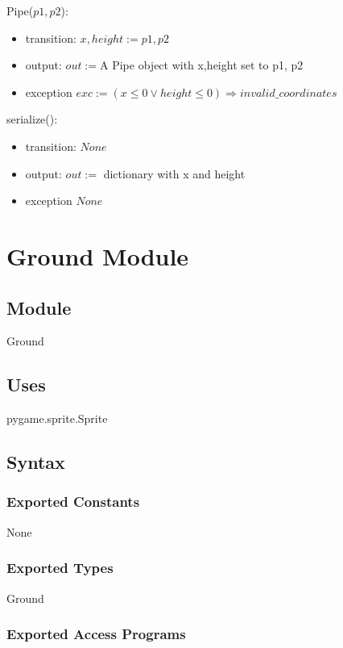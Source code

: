 \documentclass[12pt]{article}
\begin{document}
\noindent Pipe($p1, p2$):
\begin{itemize}
\item transition: $x, height := p1, p2$
\item output: $out := $A Pipe object with x,height set to p1, p2
\item exception $ exc := (x \leq 0 \lor height \leq 0 ) \Rightarrow invalid\_coordinates $
\end{itemize}

\color{red}
\noindent serialize():
\begin{itemize}
\item transition: $None$
\item output: $out := $ dictionary with x and height
\item exception $ None $
\end{itemize}
\color{black}


\newpage

\section* {Ground Module}

\subsection*{Module}

Ground

\subsection* {Uses}

pygame.sprite.Sprite

\subsection* {Syntax}

\subsubsection* {Exported Constants}

None

\subsubsection* {Exported Types}

Ground

\subsubsection* {Exported Access Programs}
\end{document}
